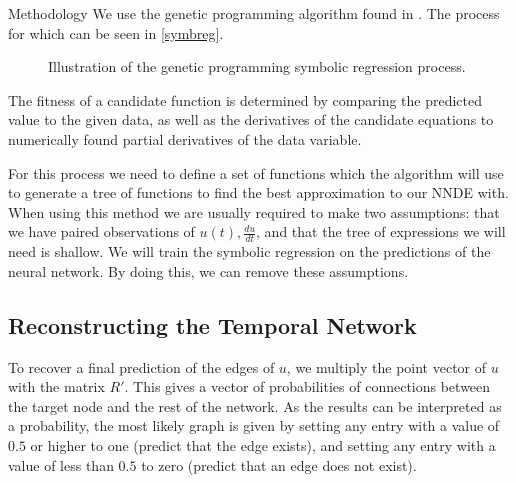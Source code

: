 \documentclass[12pt]{amsart}
\begin{document}
\begin{section}{Methodology}
        We use the genetic programming algorithm found in \cite{pysr}. The process for which can be seen in \autoref{symbreg}.

        \begin{figure}
            \centering
            \resizebox{\width}{!}{}
            \caption{Illustration of the genetic programming symbolic regression process.}
            \label{symbreg}
        \end{figure}
        
        The fitness of a candidate function is determined by comparing the predicted value to the given data, as well as the derivatives of the candidate equations to numerically found partial derivatives of the data variable.

        For this process we need to define a set of functions which the algorithm will use to generate a tree of functions to find the best approximation to our NNDE with. When using this method we are usually required to make two assumptions: that we have paired observations of $u(t), \frac{du}{dt}$, and that the tree of expressions we will need is shallow. We will train the symbolic regression on the predictions of the neural network. By doing this, we can remove these assumptions\cite{kidger2022neural}.

    \subsection{Reconstructing the Temporal Network}
        To recover a final prediction of the edges of $u$, we multiply the point vector of $u$ with the matrix $R'$. This gives a vector of probabilities of connections between the target node and the rest of the network. As the results can be interpreted as a probability, the most likely graph is given by setting any entry with a value of $0.5$ or higher to one (predict that the edge exists), and setting any entry with a value of less than $0.5$ to zero (predict that an edge does not exist).
\end{section}
\end{document}
